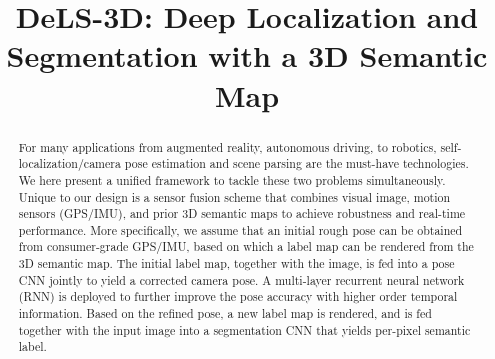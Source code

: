 \documentclass[10pt,twocolumn,letterpaper]{article}
\makeatletter
\DeclareRobustCommand\onedot{\futurelet\@let@token\@onedot}
\def\onedot{\ifx\@let@token.\else.\null\fi\xspace}
\def\eg{\emph{e.g.}}
\def\etc{\emph{etc}\onedot}
\makeatother
\begin{document}
\title{DeLS-3D: Deep Localization and Segmentation with a 3D Semantic Map}

\maketitle

\begin{abstract}
For many applications from augmented reality, autonomous driving, to robotics, self-localization/camera pose estimation and scene parsing are the must-have technologies. We here present a unified framework to tackle these two problems simultaneously. Unique to our design is a sensor fusion scheme that combines visual image, motion sensors (GPS/IMU), and prior 3D semantic maps to achieve robustness and real-time performance. More specifically, we assume that an initial rough pose can be obtained from consumer-grade GPS/IMU, based on which a label map can be rendered from the 3D semantic map. The initial label map, together with the image, is fed into a pose CNN jointly to yield a corrected camera pose.
A multi-layer recurrent neural network (RNN) is deployed to further improve the pose accuracy with higher order temporal information.
Based on the refined pose, a new label map is rendered, and is fed together with the input image into a segmentation CNN that yields per-pixel semantic label.


\end{abstract}
\end{document}
